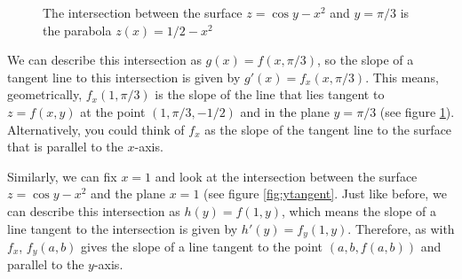 \begin{figure}[H]
    \centering
    \caption{The intersection between the surface $z = \cos{y} - x^2$ and $y = 
    \pi/3$ is the parabola $z(x) = 1/2 - x^2$}
    \label{fig:tangent}
\end{figure}

We can describe this intersection as $g(x) = f(x, \pi/3)$, so the 
slope of a tangent line to this intersection is given by $g'(x) = f_x(x, 
\pi/3)$. This means, geometrically, $f_x(1, \pi/3)$ is the slope of the line 
that lies tangent to $z = f(x, y)$ at the point $(1, \pi/3, -1/2)$ and in the 
plane $y = \pi/3$ (see figure \ref{fig:tangent}). Alternatively, you could 
think of $f_x$ as the slope of the tangent line to the surface that is 
parallel to the $x$-axis. 

Similarly, we can fix $x = 1$ and look at the intersection between the surface 
$z = \cos{y} - x^2$ and the plane $x = 1$ (see figure \ref{fig:ytangent}. 
Just like before, we can describe this intersection as $h(y) = f(1, y)$, which 
means the slope of a line tangent to the intersection is given by $h'(y) = 
f_{y}(1, y)$. Therefore, as with $f_x$, $f_y(a, b)$ gives the slope of a line 
tangent to the point $\left(a, b, f(a, b) \right)$ and parallel to the $y$-axis. 

